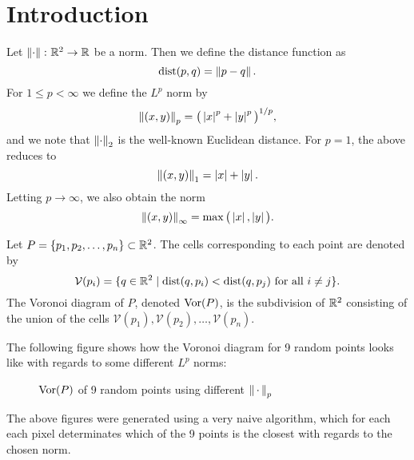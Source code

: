 \chapter{Introduction}

Let $\left\lVert \cdot \right\rVert \colon \mathbb{R}^2 \to \mathbb{R}$ be a norm. Then we define the distance function as
\begin{equation}
    \operatorname{dist}(p, q) = \left\lVert p - q \right\rVert.
\end{equation}
For $1 \leq p < \infty$ we define the $L^p$ norm by
\begin{equation}
    \left\lVert (x, y) \right\rVert_p = {\big(\left\lvert x \right\rvert^p + \left\lvert y \right\rvert^p\big)}^{1/p},
\end{equation}
and we note that $\left\lVert  \cdot  \right\rVert_2$ is the well-known Euclidean distance. For $p = 1$, the above reduces to
\begin{equation}
    \left\lVert (x, y) \right\rVert_1 = \left\lvert x \right\rvert + \left\lvert y \right\rvert.
\end{equation}
Letting $p \to \infty$, we also obtain the norm
\begin{equation}
    \left\lVert (x, y) \right\rVert_{\infty} = \max\big(\left\lvert x \right\rvert, \left\lvert y \right\rvert\big).
\end{equation}
\begin{defn}
Let $P = \{p_1, p_2, \ldots, p_n\} \subset \mathbb{R}^2$. The cells corresponding to each point are denoted by
\[
    \mathcal{V}(p_i) = \{q \in \mathbb{R}^2 \mid \operatorname{dist}(q, p_i) < \operatorname{dist}(q, p_j) \text{ for all } i \ne j\}.
\]
The Voronoi diagram of $P$, denoted $\operatorname{Vor}(P)$, is the subdivision of $\mathbb{R}^2$ consisting of the union of the cells $\mathcal{V}(p_1), \mathcal{V}(p_2), \ldots, \mathcal{V}(p_n)$.
\end{defn}

The following figure shows how the Voronoi diagram for 9 random points looks like with regards to some different $L^p$ norms:

\begin{figure}[H]
    \centering
    \hspace{0mm}
    \caption{$\operatorname{Vor}(P)$ of 9 random points using different $\left\lVert \,\cdot\, \right\rVert_p$}
    \label{fig:naive-voronoi}
\end{figure}
The above figures were generated using a very naive algorithm, which for each each pixel determinates which of the 9 points is the closest with regards to the chosen norm. \\


